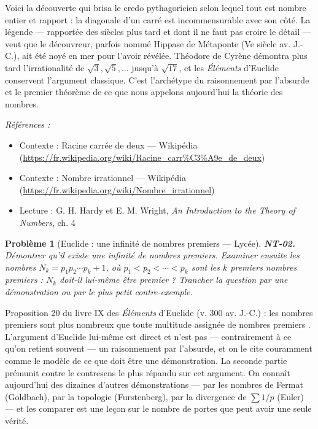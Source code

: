 \documentclass[11pt]{article}
\newtheorem{problem}{Problème}
\newenvironment{refs}{\par\small\noindent\emph{Références :}\begin{itemize}\setlength\itemsep{0pt}}{\end{itemize}\normalsize}
\begin{document}
\noindent Voici la découverte qui brisa le credo pythagoricien selon lequel tout est nombre
entier et rapport : la diagonale d'un carré est incommensurable avec son côté. La légende ---
rapportée des siècles plus tard et dont il ne faut pas croire le détail --- veut que le découvreur,
parfois nommé Hippase de Métaponte (Ve siècle av. J.-C.), ait été noyé en mer pour l'avoir
révélée. Théodore de Cyrène démontra plus tard l'irrationalité de $\sqrt{3}, \sqrt{5}, \ldots$
jusqu'à $\sqrt{17}$, et les \textit{Éléments} d'Euclide conservent l'argument classique. C'est
l'archétype du raisonnement par l'absurde et le premier théorème de ce que nous appelons aujourd'hui
la théorie des nombres.

\begin{refs}
\item Contexte : Racine carrée de deux --- Wikipédia (\url{https://fr.wikipedia.org/wiki/Racine_carr%C3%A9e_de_deux})
\item Contexte : Nombre irrationnel --- Wikipédia (\url{https://fr.wikipedia.org/wiki/Nombre_irrationnel})
\item Lecture : G. H. Hardy et E. M. Wright, \textit{An Introduction to the Theory of Numbers}, ch. 4
\end{refs}

\bigskip

\begin{problem}[{Euclide : une infinité de nombres premiers --- Lycée}]
\textbf{NT-02.} Démontrer qu'il existe une infinité de nombres premiers.
Examiner ensuite les nombres $N_k = p_1 p_2 \cdots p_k + 1$, où
$p_1 < p_2 < \cdots < p_k$ sont les $k$ premiers nombres premiers : $N_k$ doit-il
lui-même être premier ? Trancher la question par une démonstration ou par le plus petit
contre-exemple.
\end{problem}

\noindent Proposition 20 du livre IX des \textit{Éléments} d'Euclide (v. 300 av. J.-C.) :
\og{} les nombres premiers sont plus nombreux que toute multitude assignée de nombres premiers \fg{}.
L'argument d'Euclide lui-même est direct et n'est pas --- contrairement à ce qu'on retient souvent ---
un raisonnement par l'absurde, et on le cite couramment comme le modèle de ce que doit être une
démonstration. La seconde partie prémunit contre le contresens le plus répandu sur cet argument. On
connaît aujourd'hui des dizaines d'autres démonstrations --- par les nombres de Fermat (Goldbach), par
la topologie (Furstenberg), par la divergence de $\sum 1/p$ (Euler) --- et les comparer est une
leçon sur le nombre de portes que peut avoir une seule vérité.
\end{document}
